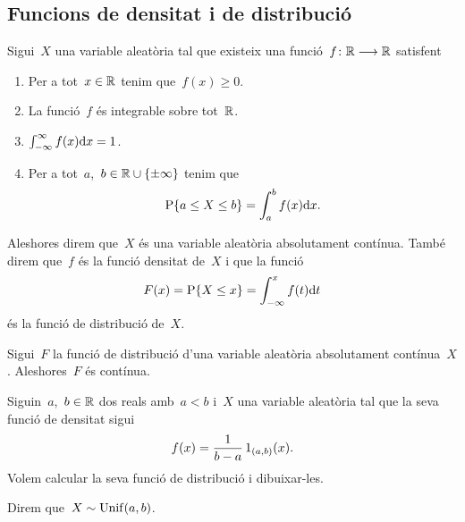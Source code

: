 \documentclass[../Apunts.tex]{subfiles}
\begin{document}
\subsection{Funcions de densitat i de distribució}
	\begin{definition}
		\label{def:variable aleatòria absolutament contínua}
		\label{def:funció de densitat d'una variable aleatòria abolsutament contínua}
		\label{def:funció de distribució d'una variable aleatòria absolutament contínua}
		Sigui~\(X\) una variable aleatòria tal que existeix una funció~\(f\colon\mathbb{R}\longrightarrow\mathbb{R}\) satisfent
		\begin{enumerate}
			\item Per a tot~\(x\in\mathbb{R}\) tenim que~\(f(x)\geq0\).
			\item La funció~\(f\) és integrable sobre tot~\(\mathbb{R}\).
			\item \(\int_{-\infty}^{\infty}f(x)\mathrm{d} x=1\).
			\item Per a tot~\(a\),~\(b\in\mathbb{R}\cup\{\pm\infty\}\) tenim que
			\[\mathrm{P}\{a\leq X\leq b\}=\int_{a}^{b}f(x)\mathrm{d} x.\]
		\end{enumerate}
		Aleshores direm que~\(X\) és una variable aleatòria absolutament contínua. També direm que~\(f\) és la funció densitat de~\(X\) i que la funció
		\[F(x)=\mathrm{P}\{X\leq x\}=\int_{-\infty}^{x}f(t)\mathrm{d} t\]
		és la funció de distribució de~\(X\).
	\end{definition}
	\begin{observation}
		\label{obs:la funció distribució d'una variable aleatòria absolutament contínua és contínua}
		Sigui~\(F\) la funció de distribució d'una variable aleatòria absolutament contínua~\(X\). Aleshores~\(F\) és contínua. %
	\end{observation}
	\begin{example}	
	\label{ex:llei uniforme}
		Siguin~\(a\),~\(b\in\mathbb{R}\) dos reals amb~\(a<b\) i~\(X\) una variable aleatòria tal que la seva funció de densitat sigui
		\begin{align*}
			f(x)=\frac{1}{b-a}\operatorname{1}_{(a,b)}(x).
		\end{align*}
		Volem calcular la seva funció de distribució i dibuixar-les.
		
		Direm que~\(X\sim\mathrm{Unif}(a,b)\).
		\begin{solution}
		\end{solution}
	\end{example}
\end{document}
